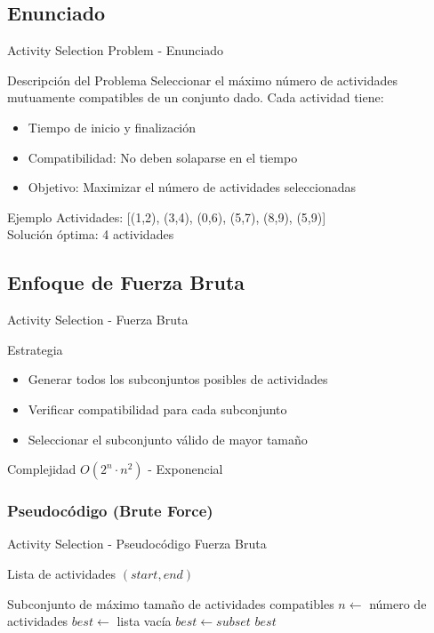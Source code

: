 \documentclass[aspectratio=169]{beamer}
\renewcommand{\algorithmicrequire}{\textbf{Entrada:}}
\renewcommand{\algorithmicensure}{\textbf{Salida:}}
\newcommand{\REQUIRE}{\item[\algorithmicrequire]}
\newcommand{\ENSURE}{\item[\algorithmicensure]}
\begin{document}
\subsection{Enunciado}
\begin{frame}{Activity Selection Problem - Enunciado}
\begin{block}{Descripción del Problema}
Seleccionar el máximo número de actividades mutuamente compatibles de un conjunto dado. Cada actividad tiene:
\begin{itemize}
\item Tiempo de inicio y finalización
\item Compatibilidad: No deben solaparse en el tiempo
\item Objetivo: Maximizar el número de actividades seleccionadas
\end{itemize}
\end{block}

\begin{exampleblock}{Ejemplo}
Actividades: [(1,2), (3,4), (0,6), (5,7), (8,9), (5,9)]\\
Solución óptima: 4 actividades
\end{exampleblock}
\end{frame}

\subsection{Enfoque de Fuerza Bruta}
\begin{frame}{Activity Selection - Fuerza Bruta}
\begin{block}{Estrategia}
\begin{itemize}
\item Generar todos los subconjuntos posibles de actividades
\item Verificar compatibilidad para cada subconjunto
\item Seleccionar el subconjunto válido de mayor tamaño
\end{itemize}
\end{block}

\begin{alertblock}{Complejidad}
$O(2^n \cdot n^2)$ - Exponencial
\end{alertblock}
\end{frame}

\subsubsection{Pseudocódigo (Brute Force)}
\begin{frame}[fragile]{Activity Selection - Pseudocódigo Fuerza Bruta}
\begin{algorithmic}[1]
\REQUIRE Lista de actividades $(start, end)$
\ENSURE Subconjunto de máximo tamaño de actividades compatibles
\State $n \leftarrow$ número de actividades
\State $best \leftarrow$ lista vacía
            \State $best \leftarrow subset$
        \EndIf
    \EndFor
\EndFor
\Return $best$
\end{algorithmic}
\end{frame}
\end{document}
